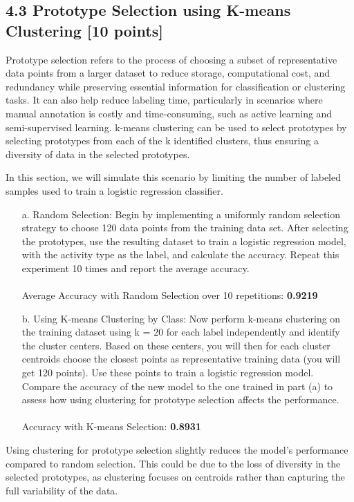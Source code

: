 \documentclass[a3paper,12pt]{extarticle} %
\begin{document}
\begin{enumerate}
\subsection*{4.3 Prototype Selection using K-means Clustering [10 points]}
Prototype selection refers to the process of choosing a subset of representative data points from a larger dataset to reduce storage, computational cost, and redundancy while preserving essential information for classification or clustering tasks. It can also help reduce labeling time, particularly in scenarios where manual annotation is costly and time-consuming, such as active learning and semi-supervised learning. k-means clustering can be used to select prototypes by selecting prototypes from each of the k identified clusters, thus ensuring a diversity of data in the selected prototypes.

In this section, we will simulate this scenario by limiting the number of labeled samples used to train a logistic regression classifier.

\begin{itemize}
\item[a.] Random Selection: Begin by implementing a uniformly random selection strategy to choose 120 data points from the training data set. After selecting the prototypes, use the resulting dataset to train a logistic regression model, with the activity type as the label, and calculate the accuracy. Repeat this experiment 10 times and report the average accuracy.
\\\\ Average Accuracy with Random Selection over 10 repetitions:\textbf{ 0.9219}
\\

\item[b.] Using K-means Clustering by Class: Now perform k-means clustering on the training dataset using k = 20 for each label independently and identify the cluster centers. Based on these centers, you will then for each cluster centroids choose the closest points as representative training data (you will get 120 points). Use these points to train a logistic regression model. Compare the accuracy of the new model to the one trained in part (a) to assess how using clustering for prototype selection affects the performance.
\\\\ Accuracy with K-means Selection: \textbf{0.8931}\\
\end{itemize}
Using clustering for prototype selection slightly reduces the model's performance compared to random selection. This could be due to the loss of diversity in the selected prototypes, as clustering focuses on centroids rather than capturing the full variability of the data.


\end{enumerate}
\end{document}
